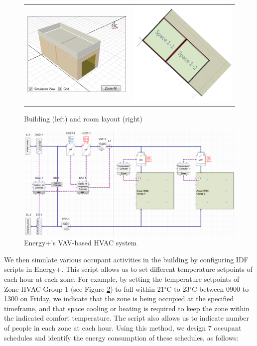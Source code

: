 \begin{figure}[h]
\centering
\begin{tabular}{cc}
\includegraphics[width=2.3in,keepaspectratio]{figs/app_buildings.png} &
\includegraphics[width=2.3in,keepaspectratio]{figs/app_layout.png} \\
\end{tabular}
\caption{Building (left) and room layout (right)}
\label{fig:ep}
\end{figure}

\begin{figure}
	\centering
		\includegraphics[width=0.9\linewidth,keepaspectratio]{./figs/app_hvac.png}		
	\caption{Energy+'s VAV-based HVAC system}
	\label{fig:epvav}
\end{figure}

We then simulate various occupant activities in the building by configuring IDF scripts in Energy+. This script allows us to set different temperature setpoints of each hour at each zone. For example, by setting the temperature setpoints of Zone HVAC Group 1 (see Figure \ref{fig:epvav}) to fall within 21$^\circ$C to 23$^\circ$C between 0900 to 1300 on Friday, we indicate that the zone is being occupied at the specified timeframe, and that space cooling or heating is required to keep the zone within the indicated comfort temperature. The script also allows us to indicate number of people in each zone at each hour. Using this method, we design 7 occupant schedules and identify the energy consumption of these schedules, as follows:

